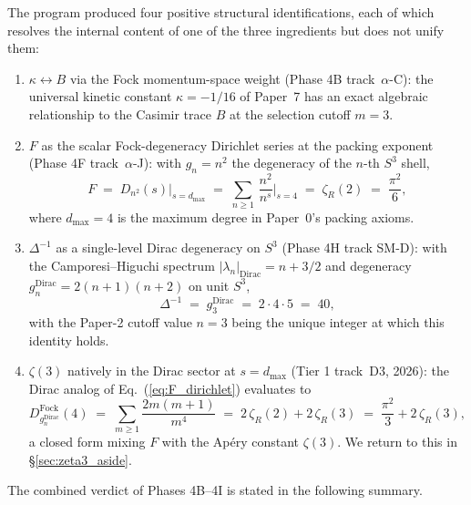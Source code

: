 \documentclass[aps,prl,twocolumn,superscriptaddress]{revtex4-2}
\begin{document}
The program produced four positive structural identifications, each of
which resolves the internal content of one of the three ingredients but
does not unify them:
\begin{enumerate}
  \item $\kappa \leftrightarrow B$ via the Fock momentum-space weight
    (Phase 4B track~$\alpha$-C): the universal kinetic constant
    $\kappa = -1/16$ of Paper~7 has an exact algebraic relationship to
    the Casimir trace $B$ at the selection cutoff $m=3$.
  \item $F$ as the scalar Fock-degeneracy Dirichlet series at the
    packing exponent (Phase 4F track~$\alpha$-J): with $g_n = n^2$ the
    degeneracy of the $n$-th $S^3$ shell,
    \begin{equation}\label{eq:F_dirichlet}
      F \;=\; D_{n^2}(s)\Big|_{s = d_{\max}}
        \;=\; \sum_{n\geq 1}\,\frac{n^2}{n^{s}}\Bigg|_{s=4}
        \;=\; \zeta_R(2) \;=\; \frac{\pi^2}{6},
    \end{equation}
    where $d_{\max}=4$ is the maximum degree in Paper~0's packing
    axioms.
  \item $\Delta^{-1}$ as a single-level Dirac degeneracy on $S^3$
    (Phase 4H track SM-D): with the Camporesi--Higuchi spectrum
    $|\lambda_n|_{\text{Dirac}} = n + 3/2$ and degeneracy
    $g_n^{\text{Dirac}} = 2(n+1)(n+2)$ on unit $S^3$,
    \begin{equation}\label{eq:Delta_dirac}
      \Delta^{-1} \;=\; g_3^{\text{Dirac}} \;=\; 2 \cdot 4 \cdot 5 \;=\; 40,
    \end{equation}
    with the Paper-2 cutoff value $n=3$ being the unique integer at
    which this identity holds.
  \item $\zeta(3)$ natively in the Dirac sector at $s = d_{\max}$
    (Tier 1 track~D3, 2026): the Dirac analog of
    Eq.~(\ref{eq:F_dirichlet}) evaluates to
    \begin{equation}\label{eq:D_dirac_zeta3}
      D_{g_n^{\text{Dirac}}}^{\text{Fock}}(4)
      \;=\; \sum_{m\geq 1}\frac{2m(m+1)}{m^4}
      \;=\; 2\,\zeta_R(2) + 2\,\zeta_R(3)
      \;=\; \frac{\pi^2}{3} + 2\,\zeta_R(3),
    \end{equation}
    a closed form mixing $F$ with the Apéry constant $\zeta(3)$. We
    return to this in \S\ref{sec:zeta3_aside}.
\end{enumerate}

The combined verdict of Phases 4B--4I is stated in the following
summary.
\end{document}
